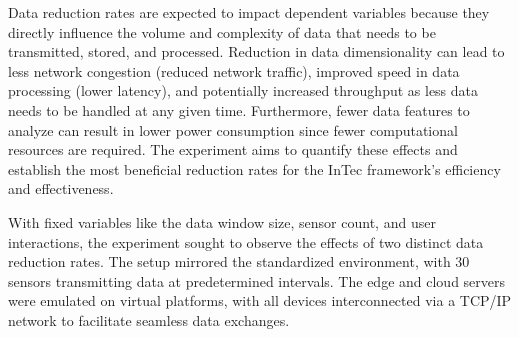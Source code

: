 \documentclass[11pt]{article}
\begin{document}
	Data reduction rates are expected to impact dependent variables because they
	directly influence the volume and complexity of data that needs to be transmitted,
	stored, and processed. Reduction in data dimensionality can lead to less network
	congestion (reduced network traffic), improved speed in data processing (lower
	latency), and potentially increased throughput as less data needs to be handled at
	any given time. Furthermore, fewer data features to analyze can result in lower
	power consumption since fewer computational resources are required. The experiment aims to quantify these effects and establish the most beneficial reduction
	rates for the InTec framework’s efficiency and effectiveness.
	
	With fixed variables like the data window size, sensor count, and user interactions, the experiment sought to observe the effects of two distinct data reduction
	rates. The setup mirrored the standardized environment, with 30 sensors transmitting data at predetermined intervals. The edge and cloud servers were emulated on virtual platforms, with all devices interconnected via a TCP/IP network to facilitate seamless data exchanges.
	
	
	
\end{document}
